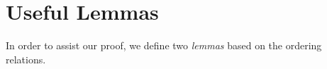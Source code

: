 \section{Useful Lemmas}    
    In order to assist our proof, we define two \textit{lemmas} based on the ordering relations. 


